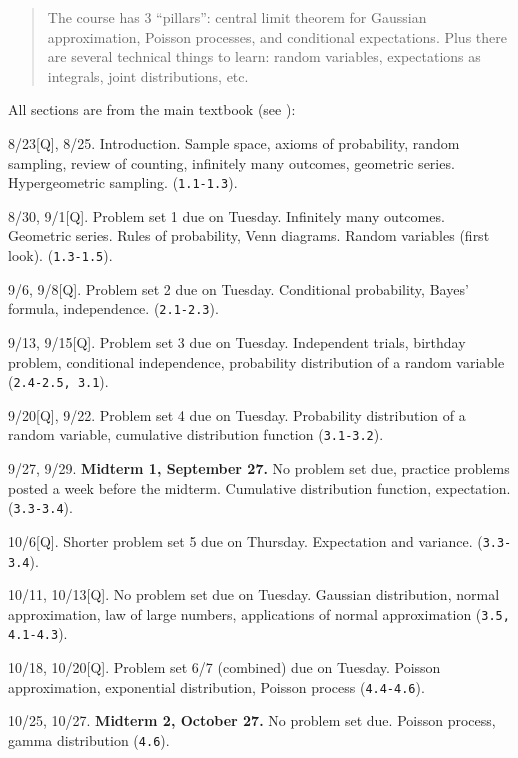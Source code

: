 \documentclass[oneside,11pt]{amsart}
\begin{document}
\begin{quote}
	The course has 3 ``pillars'': central limit theorem for Gaussian approximation, 
	Poisson processes, and conditional expectations. 
	Plus there are several technical things to learn: random variables, expectations as integrals, 
	joint distributions, etc.
\end{quote}

\bigskip

All sections are from the main textbook (see ):
\begin{enumerate}[\bf{}{[}week 1{]}]
	\item 8/23[Q], 8/25.
		Introduction. Sample space, axioms of probability, random sampling, review of counting,
		infinitely many outcomes, geometric series. Hypergeometric sampling.
		(\texttt{1.1-1.3}).
	\item 8/30, 9/1[Q].
		Problem set 1 due on Tuesday.
		Infinitely many outcomes. Geometric series. 
		Rules of probability, Venn diagrams. Random variables (first look). 
		(\texttt{1.3-1.5}).
	\item 9/6, 9/8[Q].
		Problem set 2 due on Tuesday.
		Conditional probability, Bayes' formula, independence.
		(\texttt{2.1-2.3}).
	\item 9/13, 9/15[Q].
		Problem set 3 due on Tuesday.
		Independent trials, birthday problem, conditional independence, 
		probability distribution of a random variable
		(\texttt{2.4-2.5, 3.1}).
	\item 9/20[Q], 9/22.
		Problem set 4 due on Tuesday.
		Probability distribution of a random variable,
		cumulative distribution function (\texttt{3.1-3.2}).
	\item 9/27, 9/29. \textbf{Midterm 1, September 27.}
		No problem set due, practice problems posted a week before the midterm.
		Cumulative distribution function, 
		expectation.
		(\texttt{3.3-3.4}).
	\item 
		10/6[Q].
		Shorter problem set 5 due on Thursday.
		Expectation and variance.
		(\texttt{3.3-3.4}).
	\item 10/11, 10/13[Q].
		No problem set due on Tuesday.
		Gaussian distribution, normal approximation,
		law of large numbers,
		applications of normal approximation
		(\texttt{3.5, 4.1-4.3}).
	\item 10/18, 10/20[Q]. 
		Problem set 6/7 (combined) due on Tuesday.
		Poisson approximation, exponential distribution, Poisson process
		(\texttt{4.4-4.6}).

	\item 10/25, 10/27. \textbf{Midterm 2, October 27.}
		No problem set due.		
		Poisson process, gamma distribution (\texttt{4.6}). 
		

\end{enumerate}
\end{document}
